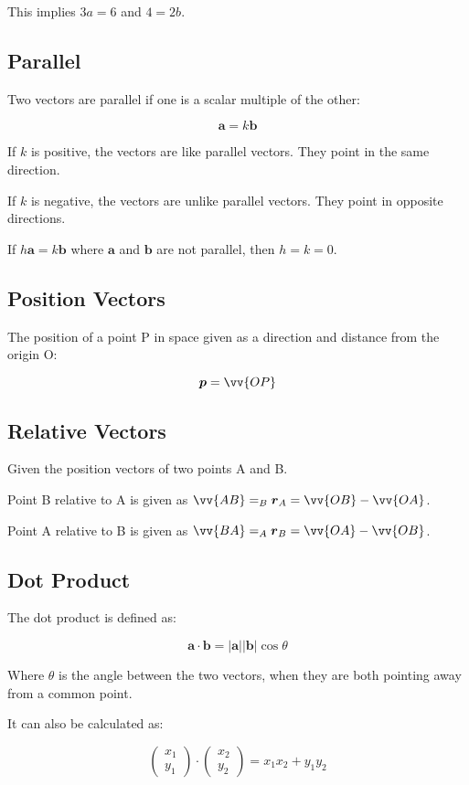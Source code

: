 \documentclass[a4paper,11pt]{article}
\newcommand{\bb}{\boldsymbol}
\begin{document}
This implies $3a = 6$ and $4 = 2b$.


\subsection{Parallel}

Two vectors are parallel if one is a scalar multiple of the other:

$$
\bb{a} = k \bb{b}
$$

If $k$ is positive, the vectors are like parallel vectors. They point in the
same direction.

If $k$ is negative, the vectors are unlike parallel vectors. They point in
opposite directions.

If $h \bb{a} = k \bb{b}$ where $\bb{a}$ and $\bb{b}$ are not parallel, then
$h = k = 0$.


\subsection{Position Vectors}

The position of a point P in space given as a direction and distance from the
origin O:

$$
\bb{p} = \vv{OP}
$$


\subsection{Relative Vectors}

Given the position vectors of two points A and B.

Point B relative to A is given as $\vv{AB} = _B\bb{r}_A = \vv{OB} - \vv{OA}$.

Point A relative to B is given as $\vv{BA} = _A\bb{r}_B = \vv{OA} - \vv{OB}$.


\subsection{Dot Product}

The dot product is defined as:

$$
\bb{a} \cdot \bb{b} = \lvert \bb{a} \rvert \lvert \bb{b} \rvert \cos{\theta}
$$

Where $\theta$ is the angle between the two vectors, when they are both pointing
away from a common point.

It can also be calculated as:

$$
\begin{pmatrix} x_1 \\ y_1 \end{pmatrix} \cdot \begin{pmatrix} x_2 \\ y_2 \end{pmatrix} = x_1 x_2 + y_1 y_2
$$
\end{document}
